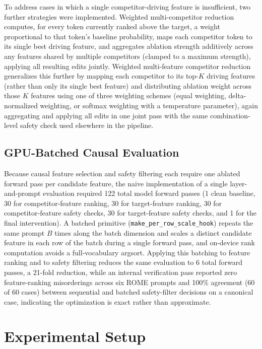\documentclass[conference]{IEEEtran}
\begin{document}
To address cases in which a single competitor-driving feature is insufficient, two further strategies were implemented. Weighted multi-competitor reduction computes, for every token currently ranked above the target, a weight proportional to that token's baseline probability, maps each competitor token to its single best driving feature, and aggregates ablation strength additively across any features shared by multiple competitors (clamped to a maximum strength), applying all resulting edits jointly. Weighted multi-feature competitor reduction generalizes this further by mapping each competitor to its top-$K$ driving features (rather than only its single best feature) and distributing ablation weight across those $K$ features using one of three weighting schemes (equal weighting, delta-normalized weighting, or softmax weighting with a temperature parameter), again aggregating and applying all edits in one joint pass with the same combination-level safety check used elsewhere in the pipeline.

\subsection{GPU-Batched Causal Evaluation}

Because causal feature selection and safety filtering each require one ablated forward pass per candidate feature, the naive implementation of a single layer-and-prompt evaluation required 122 total model forward passes (1 clean baseline, 30 for competitor-feature ranking, 30 for target-feature ranking, 30 for competitor-feature safety checks, 30 for target-feature safety checks, and 1 for the final intervention). A batched primitive (\texttt{make\_per\_row\_scale\_hook}) repeats the same prompt $B$ times along the batch dimension and scales a distinct candidate feature in each row of the batch during a single forward pass, and on-device rank computation avoids a full-vocabulary argsort. Applying this batching to feature ranking and to safety filtering reduces the same evaluation to 6 total forward passes, a 21-fold reduction, while an internal verification pass reported zero feature-ranking misorderings across six ROME prompts and 100\% agreement (60 of 60 cases) between sequential and batched safety-filter decisions on a canonical case, indicating the optimization is exact rather than approximate.

\section{Experimental Setup}
\end{document}
